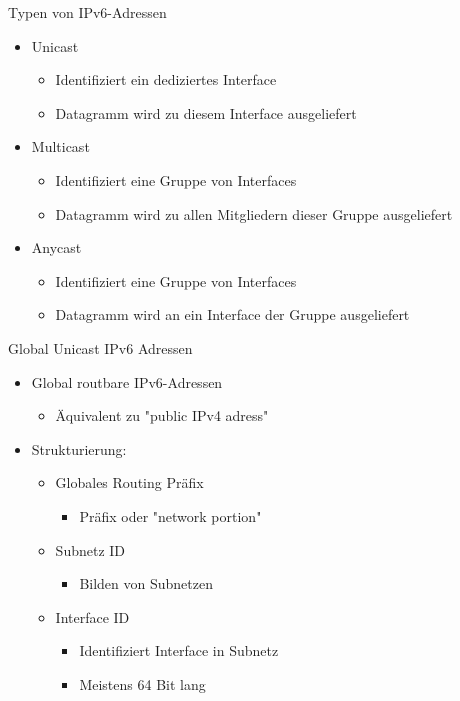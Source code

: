       Typen von IPv6-Adressen
      \begin{itemize}
        \item Unicast
          \begin{itemize}
            \item Identifiziert ein dediziertes Interface
            \item Datagramm wird zu diesem Interface ausgeliefert
          \end{itemize}
        \item Multicast
          \begin{itemize}
            \item Identifiziert eine Gruppe von Interfaces
            \item Datagramm wird zu allen Mitgliedern dieser Gruppe ausgeliefert
          \end{itemize}
        \item Anycast
          \begin{itemize}
            \item Identifiziert eine Gruppe von Interfaces
            \item Datagramm wird an ein Interface der Gruppe ausgeliefert
          \end{itemize}
      \end{itemize}
      Global Unicast IPv6 Adressen
      \begin{itemize}
        \item Global routbare IPv6-Adressen
          \begin{itemize}
            \item Äquivalent zu "public IPv4 adress"
          \end{itemize}
        \item Strukturierung:
          \begin{itemize}
            \item Globales Routing Präfix
              \begin{itemize}
                \item Präfix oder "network portion"
              \end{itemize}
            \item Subnetz ID
              \begin{itemize}
                \item Bilden von Subnetzen
              \end{itemize}
            \item Interface ID
              \begin{itemize}
                \item Identifiziert Interface in Subnetz
                \item Meistens 64 Bit lang
              \end{itemize}
          \end{itemize}
      \end{itemize}
